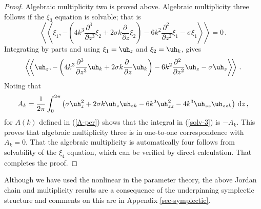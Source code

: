 \documentclass[10pt]{article}
\def\rd{{\rm d}} \def\re{{\rm e}} \def\fr{\mbox{$\frac{1}{2}$}}
\begin{document}
\begin{proof}
Algebraic multiplicity two is proved above. Algebraic
multiplicity three follows if the $\xi_3$ equation is solvable; that is
\[
\left\langle\!\left\langle\xi_1,-\left( 4k^3 \frac{\partial^3\ }{\partial z^3}\xi_2
 + 2\sigma k \frac{\partial\ }{\partial z}\xi_2\right) -
6k^2\frac{\partial^2\ }{\partial z^2}\xi_1 - \sigma\xi_1\right\rangle\!\right\rangle =0\,.
\]
Integrating by parts and using $\xi_1=\uh_z$ and $\xi_2=\uh_k$, gives
%
\begin{equation}\label{solv-3}
\left\langle\!\left\langle\uh_z,-\left( 4k^3 \frac{\partial^3\ }{\partial z^3}\uh_k
 + 2\sigma k \frac{\partial\ }{\partial z}\uh_k\right) -
6k^2\frac{\partial^2\ }{\partial z^2}\uh_z - \sigma\uh_z\right\rangle\!\right\rangle \,.
\end{equation}
%
Noting that 
\[
A_k = \frac{1}{2\pi}\int_0^{2\pi}\left(
\sigma \uh_z^2 + 2\sigma k \uh_z\uh_{zk} - 6k^2\uh_{zz}^2 -
4k^3\uh_{zz}\uh_{zzk}\right)\,\rd z\,,
\]
for $A(k)$ defined in (\ref{A-per}) shows that the integral in (\ref{solv-3}) is
$-A_k$. This proves that algebraic multiplicity three is in one-to-one
correspondence with $A_k=0$. That the algebraic multiplicity is automatically
four follows from solvability of the $\xi_4$ equation, which can be verified by
direct calculation.  That completes the proof. 
\end{proof}

Although we have used the nonlinear in the parameter theory, the above Jordan
chain and multiplicity results are a consequence of the underpinning symplectic structure and comments on this are in Appendix \ref{sec-symplectic}.
\end{document}
